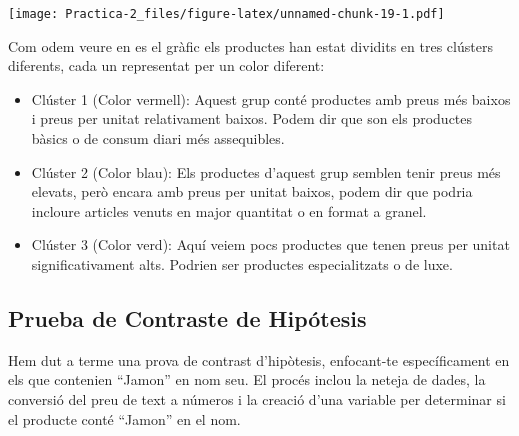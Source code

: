 \documentclass[
]{article}
\begin{document}
\texttt{[image: Practica-2\_files/figure-latex/unnamed-chunk-19-1.pdf]}

Com odem veure en es el gràfic els productes han estat dividits en tres
clústers diferents, cada un representat per un color diferent:

\begin{itemize}
\item
  Clúster 1 (Color vermell): Aquest grup conté productes amb preus més
  baixos i preus per unitat relativament baixos. Podem dir que son els
  productes bàsics o de consum diari més assequibles.
\item
  Clúster 2 (Color blau): Els productes d'aquest grup semblen tenir
  preus més elevats, però encara amb preus per unitat baixos, podem dir
  que podria incloure articles venuts en major quantitat o en format a
  granel.
\item
  Clúster 3 (Color verd): Aquí veiem pocs productes que tenen preus per
  unitat significativament alts. Podrien ser productes especialitzats o
  de luxe.
\end{itemize}

\hypertarget{prueba-de-contraste-de-hipuxf3tesis}{%
\subsection{Prueba de Contraste de
Hipótesis}\label{prueba-de-contraste-de-hipuxf3tesis}}

Hem dut a terme una prova de contrast d'hipòtesis, enfocant-te
específicament en els que contenien ``Jamon'' en nom seu. El procés
inclou la neteja de dades, la conversió del preu de text a números i la
creació d'una variable per determinar si el producte conté ``Jamon'' en
el nom.
\end{document}
